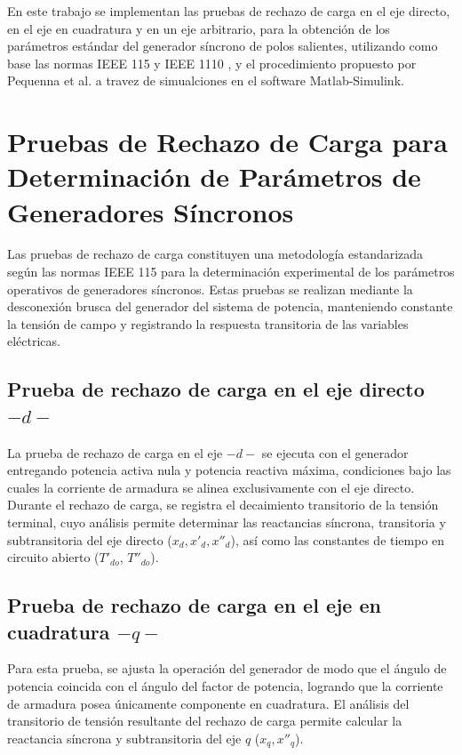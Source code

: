 \documentclass[conference]{IEEEtran}
\begin{document}

En este trabajo se implementan las pruebas de rechazo de carga en el eje directo, en el eje en cuadratura y en un eje arbitrario, para la obtención de los parámetros estándar del generador síncrono de polos salientes, utilizando como base las normas IEEE 115 \cite{IEEE115} y IEEE 1110 \cite{IEEE1110}, y el procedimiento propuesto por Pequenna et al. \cite{pequena,Pequena2010} a travez de simualciones en el software Matlab-Simulink.

\section{Pruebas de Rechazo de Carga para Determinación de Parámetros de Generadores Síncronos} 

Las pruebas de rechazo de carga constituyen una metodología estandarizada según las normas IEEE 115
para la determinación experimental de los parámetros operativos de generadores síncronos. Estas pruebas
se realizan mediante la desconexión brusca del generador del sistema de potencia, manteniendo constante
la tensión de campo y registrando la respuesta transitoria de las variables eléctricas.

\subsection{Prueba de rechazo de carga en el eje directo $-d-$}

La prueba de rechazo de carga en el eje $-d-$ se ejecuta con el generador entregando potencia activa nula y potencia reactiva máxima, condiciones bajo las cuales la corriente de armadura se alinea exclusivamente con el eje directo.
Durante el rechazo de carga, se registra el decaimiento transitorio de la tensión terminal, cuyo análisis
permite determinar las reactancias síncrona, transitoria y subtransitoria del eje directo ($x_d, x'_d, x''_d$), así como las constantes de tiempo en circuito abierto ($T'_{do}$, $T''_{do}$).

\subsection{Prueba de rechazo de carga en el eje en cuadratura $-q-$}

Para esta prueba, se ajusta la operación del generador de modo que el ángulo de potencia coincida con el ángulo del factor de potencia, logrando que la corriente de armadura posea únicamente componente en cuadratura. El análisis del transitorio de tensión resultante del rechazo de carga permite calcular la reactancia síncrona y subtransitoria del eje $q$ ($x_q, x''_q$).
\end{document}
